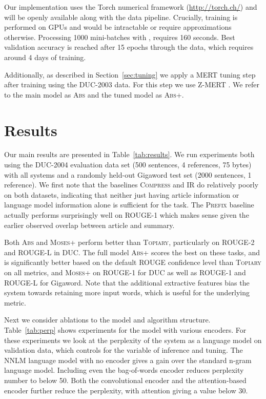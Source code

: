 \documentclass[11pt,a4paper]{article}
\begin{document}
Our implementation uses the Torch numerical framework
(\url{http://torch.ch/}) and will be openly available along with the
data pipeline. Crucially, training is performed on GPUs and would be
intractable or require approximations otherwise. Processing 1000
mini-batches with ,  requires 160 seconds.  Best
validation accuracy is reached after 15 epochs through the data, which
requires around 4 days of training.

Additionally, as described in Section~\ref{sec:tuning} we apply a
MERT tuning step after training using the DUC-2003 data.  For this step we use Z-MERT
\cite{zaidan2009z}. We refer to the
main model as \textsc{Abs} and the tuned model as
\textsc{Abs+}.
 


\section{Results}
\label{sec:results}

Our main results are presented in Table~\ref{tab:results}. We run
experiments both using the DUC-2004 evaluation data set (500
sentences, 4 references, 75 bytes) with all systems and a randomly
held-out Gigaword test set (2000 sentences, 1 reference). We first
note that the baselines \textsc{Compress} and \textsc{IR} do
relatively poorly on both datasets, indicating that neither just
having article information or language model information alone is
sufficient for the task. The \textsc{Prefix} baseline actually
performs surprisingly well on ROUGE-1 which makes sense given the
earlier observed overlap between article and summary. 


Both \textsc{Abs} and \textsc{Moses+} perform better than
\textsc{Topiary}, particularly on ROUGE-2 and ROUGE-L in DUC.  The
full model \textsc{Abs+} scores the best on these tasks, and is
significantly better based on the default ROUGE confidence level than
\textsc{Topiary} on all metrics, and \textsc{Moses+} on
ROUGE-1 for DUC as well as ROUGE-1 and ROUGE-L for Gigaword. Note that the additional extractive features bias the
system towards retaining more input words, which is useful for the
underlying metric.

Next we consider ablations to the model and algorithm
structure. Table~\ref{tab:perp} shows experiments for the model with
various encoders. For these experiments we look at the perplexity of
the system as a language model on validation data, which controls for
the variable of inference and tuning.  The NNLM language model with no
encoder gives a gain over the standard n-gram language
model. Including even the bag-of-words encoder reduces perplexity
number to below 50. Both the convolutional encoder and the
attention-based encoder further reduce the perplexity, with
attention giving a value below 30.
\end{document}
